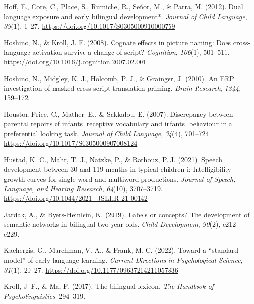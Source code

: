 \documentclass[
]{article}
\newlength{\cslhangindent}
\newlength{\cslentryspacingunit} %
\newenvironment{CSLReferences}[2] %
 {%
  \setlength{\parindent}{0pt}
  \ifodd #1
  \let\oldpar\par
  \def\par{\hangindent=\cslhangindent\oldpar}
  \fi
  \setlength{\parskip}{#2\cslentryspacingunit}
 }%
 {}
\begin{document}
\begin{CSLReferences}{1}{0}
\leavevmode{}%
Hoff, E., Core, C., Place, S., Rumiche, R., Señor, M., \& Parra, M.
(2012). Dual language exposure and early bilingual development*.
\emph{Journal of Child Language}, \emph{39}(1), 1--27.
\url{https://doi.org/10.1017/S0305000910000759}

\leavevmode{}%
Hoshino, N., \& Kroll, J. F. (2008). Cognate effects in picture naming:
Does cross-language activation survive a change of script?
\emph{Cognition}, \emph{106}(1), 501--511.
\url{https://doi.org/10.1016/j.cognition.2007.02.001}

\leavevmode{}%
Hoshino, N., Midgley, K. J., Holcomb, P. J., \& Grainger, J. (2010). An
ERP investigation of masked cross-script translation priming.
\emph{Brain Research}, \emph{1344}, 159--172.

\leavevmode{}%
Houston-Price, C., Mather, E., \& Sakkalou, E. (2007). Discrepancy
between parental reports of infants' receptive vocabulary and infants'
behaviour in a preferential looking task. \emph{Journal of Child
Language}, \emph{34}(4), 701--724.
\url{https://doi.org/10.1017/S0305000907008124}

\leavevmode{}%
Hustad, K. C., Mahr, T. J., Natzke, P., \& Rathouz, P. J. (2021). Speech
development between 30 and 119 months in typical children i:
Intelligibility growth curves for single-word and multiword productions.
\emph{Journal of Speech, Language, and Hearing Research}, \emph{64}(10),
3707--3719. \url{https://doi.org/10.1044/2021_JSLHR-21-00142}

\leavevmode{}%
Jardak, A., \& Byers-Heinlein, K. (2019). Labels or concepts? The
development of semantic networks in bilingual two-year-olds. \emph{Child
Development}, \emph{90}(2), e212--e229.

\leavevmode{}%
Kachergis, G., Marchman, V. A., \& Frank, M. C. (2022). Toward a
{``standard model''} of early language learning. \emph{Current
Directions in Psychological Science}, \emph{31}(1), 20--27.
\url{https://doi.org/10.1177/09637214211057836}

\leavevmode{}%
Kroll, J. F., \& Ma, F. (2017). The bilingual lexicon. \emph{The
Handbook of Psycholinguistics}, 294--319.


\end{CSLReferences}
\end{document}
